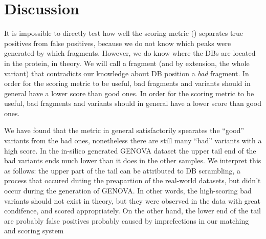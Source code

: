 \section{Discussion}

It is impossible to directly test how well the scoring metric () separates true positives from false positives, because we do not know which peaks were generated by which fragments. However, we do know where the DBs are located in the protein, in theory. We will call a fragment (and by extension, the whole variant) that contradicts our knowledge about DB position a \emph{bad} fragment. In order for the scoring metric to be useful, bad fragments and variants should in general have a lower score than good ones.  In order for the scoring metric to be useful, bad fragments and variants should in general have a lower score than good ones.

We have found that the metric in general satisfactorily spearates the ``good'' variants from the bad ones, nonetheless there are still many ``bad'' variants with a high score. In the in-silico generated GENOVA dataset the upper tail end of the bad variants ends much lower than it does in the other samples. We interpret this as follows: the upper part of the tail can be attributed to DB scrambling, a process that occured duting the preapartion of the real-world datasets, but didn't occur during the generation of GENOVA. In other words, the high-scoring bad variants should not exist in theory, but they were observed  in the data with great condifence, and scored appropriately. On the other hand, the lower end of the tail are probably false positives probably caused by imprefections in our matching and scoring system





